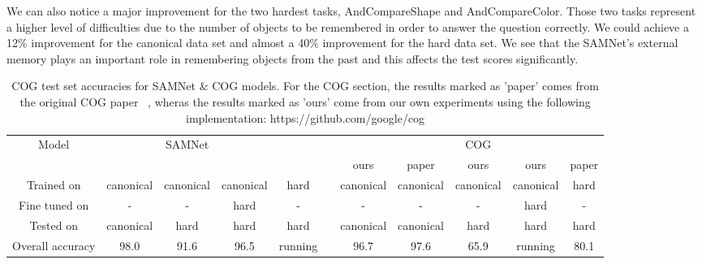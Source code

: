 We can also notice a major improvement for the two hardest tasks, AndCompareShape and AndCompareColor. Those two tasks represent a higher level of difficulties due to the number of objects to be remembered in order to answer the question correctly.
We could achieve a 12\% improvement for the canonical data set and almost a 40\% improvement for the hard data set.
We see that the SAMNet's external memory plays an important role in remembering objects from the past and this affects the test scores significantly. 


\begin{table}[t]
	\tiny
	
	\caption{COG test set accuracies for  SAMNet \& COG models. For the COG section, the results marked as 'paper' comes from the original COG paper ~\cite{cog2018}, wheras the results marked as 'ours' come from our own experiments using the following implementation: https://github.com/google/cog }
	
	\centering
	\begin{tabular}{ccccccccccc}
		\toprule
		Model & & SAMNet & && &&& COG& \\
		\cmidrule{2-5} \cmidrule{7-11} 
		&&&&&& ours & paper & ours & ours & paper\\
		\cmidrule{7-9} \cmidrule{10-11}
		Trained on       & canonical & canonical & canonical & hard &            & canonical &  canonical  & canonical  & canonical & hard \\ 
		Fine tuned on  & - & - & hard  & - &           &- & -   & - & hard & - \\ 
		Tested on        & canonical & hard & hard & hard &           & canonical  &  canonical  & hard & hard & hard  \\ 
		\midrule
		
		Overall accuracy & 98.0 & 91.6 & 96.5  & running &           & 96.7 & 97.6  & 65.9 & running& 80.1 \\ 
		
		\midrule 
		

\end{tabular}
\end{table}
